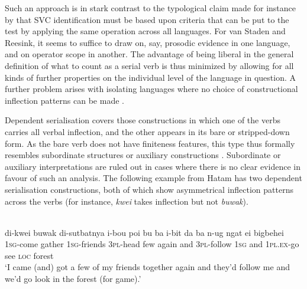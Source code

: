 Such an approach is in stark contrast to the typological claim made for instance by \citet{haspelmath2016serial} that SVC identification must be based upon criteria that can be put to the test by applying the same operation across all languages. For van Staden and Reesink, it seems to suffice to draw on, say, prosodic evidence in one language, and on operator scope in another. The advantage of being liberal in the general definition of what to count as a serial verb is thus minimized by allowing for all kinds of further properties on the individual level of the language in question. A further problem arises with isolating languages where no choice of constructional inflection patterns can be made \citep[23]{vanstaden2008serial}.

Dependent serialisation covers those constructions in which one of the verbs carries all verbal inflection, and the other appears in its bare or stripped-down form. As the bare verb does not have finiteness features, this type thus formally resembles subordinate structures or auxiliary constructions \citep[24]{vanstaden2008serial}. Subordinate or auxiliary interpretations are ruled out in cases where there is no clear evidence in favour of such an analysis. The following example from Hatam has two dependent serialisation constructions, both of which show asymmetrical inflection patterns across the verbs (for instance, \textit{kwei} takes inflection but not \textit{buwak}).

\ea \label{}
\\
\gll di-kwei buwak di-sutbatnya i-bou poi bu ba i-bit da ba n-ug ngat ei bigbehei \\
\textsc{1}\textsc{sg}-come gather \textsc{1}\textsc{sg}-friends \textsc{3}\textsc{pl}-head few again and \textsc{3}\textsc{pl}-follow \textsc{1}\textsc{sg} and \textsc{1}\textsc{pl}.\textsc{ex}-go see \textsc{loc} forest \\
\glft `I came (and) got a few of my friends together again and they'd follow me and we'd go look in the forest (for game).'\\ 
\z

